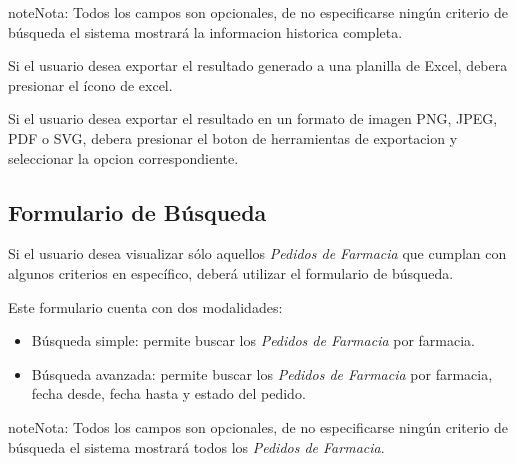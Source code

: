\documentclass[a4paper,10pt,spanish]{sphinxmanual}
\begin{document}
\begin{notice}{note}{Nota:}
Todos los campos son opcionales, de no especificarse ningún criterio de búsqueda el sistema mostrará la informacion historica completa.
\end{notice}


Si el usuario desea exportar el resultado generado a una planilla de Excel, debera presionar el ícono de excel.


Si el usuario desea exportar el resultado en un formato de imagen PNG, JPEG, PDF o SVG, debera presionar el boton de herramientas de exportacion y seleccionar la opcion correspondiente.



\subsection{Formulario de Búsqueda}
\label{pedidosfarmacia:formulario-de-busqueda}\label{pedidosfarmacia:formulario-busqueda-pf}
Si el usuario desea visualizar sólo aquellos \emph{Pedidos de Farmacia} que cumplan con algunos criterios en específico, deberá utilizar el formulario de búsqueda.


Este formulario cuenta con dos modalidades:
\begin{itemize}
\item {} 
Búsqueda simple: permite buscar los \emph{Pedidos de Farmacia} por farmacia.

\item {} 
Búsqueda avanzada: permite buscar los \emph{Pedidos de Farmacia} por farmacia, fecha desde, fecha hasta y estado del pedido.

\end{itemize}

\begin{notice}{note}{Nota:}
Todos los campos son opcionales, de no especificarse ningún criterio de búsqueda el sistema mostrará todos los \emph{Pedidos de Farmacia}.
\end{notice}
\end{document}
